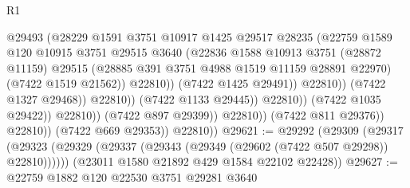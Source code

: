 \begin{lexlean}{R1}
\begin{coremodule}
                                              @29493
                                              (@28229
                                                @1591
                                                @3751
                                                @10917
                                                @1425
                                                @29517
                                                @28235
                                                (@22759
                                                  @1589
                                                  @120
                                                  @10915
                                                  @3751
                                                  @29515
                                                  @3640
                                                  (@22836
                                                    @1588
                                                    @10913
                                                    @3751
                                                    (@28872 @11159)
                                                    @29515
                                                    (@28885
                                                      @391
                                                      @3751
                                                      @4988
                                                      @1519
                                                      @11159
                                                      @28891
                                                      @22970)
                                                    (@7422 @1519 @21562))
                                                  @22810))
                                              (@7422 @1425 @29491))
                                            @22810))
                                        (@7422 @1327 @29468))
                                      @22810))
                                  (@7422 @1133 @29445))
                                @22810))
                            (@7422 @1035 @29422))
                          @22810))
                      (@7422 @897 @29399))
                    @22810))
                (@7422 @811 @29376))
              @22810))
          (@7422 @669 @29353))
        @22810))
@29621 := @29292
    (@29309
      (@29317 (@29323 (@29329 (@29337 (@29343 (@29349 (@29602 (@7422 @507 @29298)) @22810))))))
      (@23011 @1580 @21892 @429 @1584 @22102 @22428))
@29627 := @22759 @1882 @120 @22530 @3751 @29281 @3640

\end{coremodule}
\end{lexlean}
